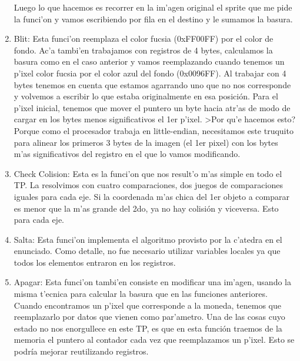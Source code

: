 \begin{enumerate}
Luego lo que hacemos es recorrer en la im'agen original el sprite que me pide la funci'on y vamos escribiendo por fila en el destino y le sumamos la basura.
\item Blit:
Esta funci'on reemplaza el color fucsia (0xFF00FF) por el color de fondo.  Ac'a tambi'en trabajamos con registros de 4 bytes, calculamos la basura como en el caso anterior y vamos reemplazando cuando tenemos un p'ixel color fucsia por el color azul del fondo (0x0096FF).  Al trabajar con 4 bytes tenemos en cuenta que estamos agarrando uno que no nos corresponde y volvemos a escribir lo que estaba originalmente en esa posición.  Para el p'ixel inicial, tenemos que mover el puntero un byte hacia atr'as de modo de cargar en los bytes menos significativos el 1er p'ixel.  >Por qu'e hacemos esto?  Porque como el procesador trabaja en little-endian, necesitamos este truquito para alinear los primeros 3 bytes de la imagen (el 1er pixel) con los bytes m'as significativos del registro en el que lo vamos modificando.
\item Check Colision:
Esta es la funci'on que nos result'o m'as simple en todo el TP.  La resolvimos con cuatro comparaciones, dos juegos de comparaciones iguales para cada eje.  Si la coordenada m'as chica del 1er objeto a comparar es menor que la m'as grande del 2do, ya no hay colisión y viceversa.  Esto para cada eje.
\item Salta:
Esta funci'on implementa el algoritmo provisto por la c'atedra en el enunciado.  Como detalle, no fue necesario utilizar variables locales ya que todos los elementos entraron en los registros.
\item Apagar:
Esta funci'on tambi'en consiste en modificar una im'agen, usando la misma t'ecnica para calcular la basura que en las funciones anteriores.  Cuando encontramos un p'ixel que corresponde a la moneda, tenemos que reemplazarlo por datos que vienen como par'ametro.  Una de las cosas cuyo estado no nos enorgullece en este TP, es que en esta función traemos de la memoria el puntero al contador cada vez que reemplazamos un p'ixel.  Esto se podría mejorar reutilizando registros.
\end{enumerate}



